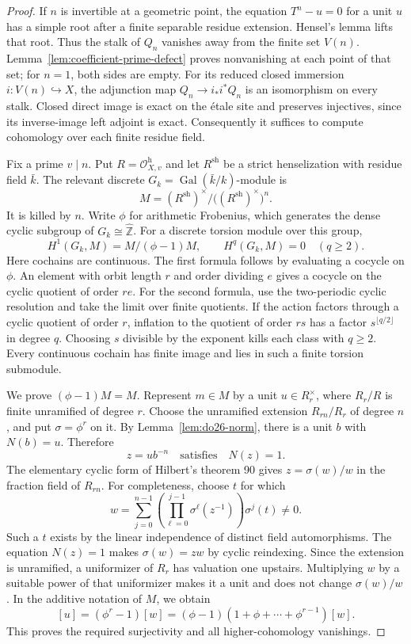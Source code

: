 \begin{proof}
If \(n\) is invertible at a geometric point, the equation
\(T^n-u=0\) for a unit \(u\) has a simple root after a finite
separable residue extension.  Hensel's lemma lifts that root.  Thus the
stalk of \(Q_n\) vanishes away from the finite set \(V(n)\).
Lemma~\ref{lem:coefficient-prime-defect} proves nonvanishing at
each point of that set; for \(n=1\), both sides are empty.
For its reduced closed immersion \(i:V(n)\hookrightarrow X\), the
adjunction map \(Q_n\to i_*i^*Q_n\) is an isomorphism on every stalk.
Closed direct image is exact on the \'etale site and preserves injectives,
since its inverse-image left adjoint is exact.  Consequently it suffices
to compute cohomology over each finite residue field.

Fix a prime \(v\mid n\).  Put \(R=\mathcal O_{X,v}^{\mathrm h}\)
and let \(R^{\mathrm{sh}}\) be a strict henselization with residue
field \(\bar k\).  The relevant discrete
\(G_k=\operatorname{Gal}(\bar k/k)\)-module is
\[
 M=(R^{\mathrm{sh}})^\times/
                \bigl((R^{\mathrm{sh}})^\times\bigr)^n.
\]
It is killed by \(n\).  Write \(\phi\) for arithmetic Frobenius,
which generates the dense cyclic subgroup of \(G_k\cong\widehat{\mathbb Z}\).
For a discrete torsion module over this group,
\[
 H^1(G_k,M)=M/(\phi-1)M,\qquad H^q(G_k,M)=0\quad(q\geq2).
\]
Here cochains are continuous.  The first formula follows by evaluating
a cocycle on \(\phi\).  An element with orbit length \(r\) and order
dividing \(e\) gives a cocycle on the cyclic quotient of order \(re\).
For the second formula, use the two-periodic cyclic resolution and take
the limit over finite quotients.  If the action factors through a cyclic
quotient of order \(r\), inflation to the quotient of order \(rs\)
has a factor \(s^{\lfloor q/2\rfloor}\) in degree \(q\).
Choosing \(s\) divisible by the exponent kills each class with
\(q\geq2\).  Every continuous cochain has finite image and lies in
such a finite torsion submodule.

We prove \((\phi-1)M=M\).  Represent \(m\in M\) by a unit
\(u\in R_r^\times\), where \(R_r/R\) is finite unramified of
degree \(r\).  Choose the unramified extension \(R_{rn}/R_r\)
of degree \(n\), and put \(\sigma=\phi^r\) on it.  By
Lemma~\ref{lem:do26-norm}, there is a unit \(b\) with
\(N(b)=u\).  Therefore
\[
 z=u b^{-n}\quad\text{satisfies}\quad N(z)=1.
\]
The elementary cyclic form of Hilbert's theorem 90 gives
\(z=\sigma(w)/w\) in the fraction field of \(R_{rn}\).
For completeness, choose \(t\) for which
\[
 w=\sum_{j=0}^{n-1}
    \left(\prod_{\ell=0}^{j-1}\sigma^\ell(z^{-1})\right)\sigma^j(t)
 \ne0.
\]
Such a \(t\) exists by the linear independence of distinct field
automorphisms.  The equation \(N(z)=1\) makes
\(\sigma(w)=zw\) by cyclic reindexing.  Since the extension is
unramified, a uniformizer of \(R_r\) has valuation one upstairs.
Multiplying \(w\) by a suitable power of that uniformizer makes it a
unit and does not change \(\sigma(w)/w\).
In the additive notation of \(M\), we obtain
\[
 [u]=(\phi^r-1)[w]
     =(\phi-1)(1+\phi+\cdots+\phi^{r-1})[w].
\]
This proves the required surjectivity and all higher-cohomology vanishings.
\end{proof}

